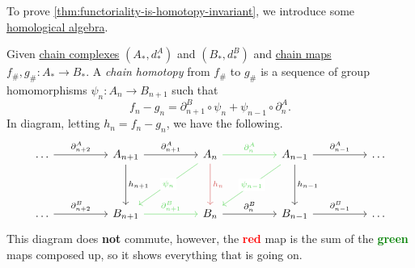 To prove \autoref{thm:functoriality-is-homotopy-invariant}, we introduce some \hyperref[sec:homological-algebra]{homological algebra}.

\begin{definition}\label{def:chain-homotopy}
	Given \hyperref[def:chain-complex]{chain complexes} $(A_\ast, d^A_\ast)$ and $(B_\ast, d^B_\ast)$ and \hyperref[def:chain-map]{chain maps}
	$f_\#, g_\# \colon  A_\ast \to B_\ast$. A \emph{chain homotopy} from $f_\#$ to $g_\#$ is a sequence of group homomorphisms $\psi_n\colon A_n \to B_{n + 1}$ such that
	\[
		f_n - g_n = \partial ^B_{n + 1} \circ \psi_n + \psi_{n - 1} \circ \partial _n^A.
	\]
	In diagram, letting $h_n = f_n - g_n$, we have the following.
	\[\begin{tikzcd}
			\ldots && {A_{n+1}} && {A_{n}} && {A_{n-1}} && \ldots \\
			\\
			\ldots && {B_{n+1}} && {B_{n}} && {B_{n-1}} && \ldots
			\arrow["{\partial^A_{n-1}}", from=1-7, to=1-9]
			\arrow["{\partial^B_{n-1}}", from=3-7, to=3-9]
			\arrow["{\partial^A_{n}}", color={rgb,255:red,92;green,214;blue,92}, from=1-5, to=1-7]
			\arrow["{\partial^B_{n}}", from=3-5, to=3-7]
			\arrow["{\partial^B_{n+1}}", color={rgb,255:red,92;green,214;blue,92}, from=3-3, to=3-5]
			\arrow["{\partial^A_{n+2}}", from=1-1, to=1-3]
			\arrow["{\partial^B_{n+2}}", from=3-1, to=3-3]
			\arrow["{h_{n+1}}", from=1-3, to=3-3]
			\arrow["{h_{n}}", color={rgb,255:red,214;green,92;blue,92}, from=1-5, to=3-5]
			\arrow["{h_{n-1}}", from=1-7, to=3-7]
			\arrow["{\partial^A_{n+1}}", from=1-3, to=1-5]
			\arrow["{\psi_n}"{description}, color={rgb,255:red,92;green,214;blue,92}, from=1-5, to=3-3]
			\arrow["{\psi_{n-1}}"{description}, color={rgb,255:red,92;green,214;blue,92}, from=1-7, to=3-5]
		\end{tikzcd}\]
	This diagram does \textbf{not} commute, however, the \textbf{\textcolor{red}{red}} map is the sum of the
	\textbf{\textcolor{green}{green}} maps composed up, so it shows everything that is going on.
\end{definition}

